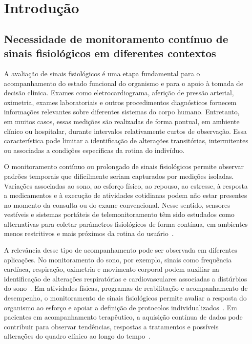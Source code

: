 \documentclass[a4paper,12pt]{fcte}
\begin{document}


\chapter{Introdução}
\label{chap:IT}

\section{Necessidade de monitoramento contínuo de sinais fisiológicos em diferentes contextos}

A avaliação de sinais fisiológicos é uma etapa fundamental para o acompanhamento do estado funcional do organismo e para o apoio à tomada de decisão clínica. Exames como eletrocardiograma, aferição de pressão arterial, oximetria, exames laboratoriais e outros procedimentos diagnósticos fornecem informações relevantes sobre diferentes sistemas do corpo humano. Entretanto, em muitos casos, essas medições são realizadas de forma pontual, em ambiente clínico ou hospitalar, durante intervalos relativamente curtos de observação. Essa característica pode limitar a identificação de alterações transitórias, intermitentes ou associadas a condições específicas da rotina do indivíduo.

O monitoramento contínuo ou prolongado de sinais fisiológicos permite observar padrões temporais que dificilmente seriam capturados por medições isoladas. Variações associadas ao sono, ao esforço físico, ao repouso, ao estresse, à resposta a medicamentos e à execução de atividades cotidianas podem não estar presentes no momento da consulta ou do exame convencional. Nesse sentido, sensores vestíveis e sistemas portáteis de telemonitoramento têm sido estudados como alternativas para coletar parâmetros fisiológicos de forma contínua, em ambientes menos restritivos e mais próximos da rotina do usuário~\cite{ates2022wearable_sensors,vaghasiya2023wearable_telehealth}.

A relevância desse tipo de acompanhamento pode ser observada em diferentes aplicações. No monitoramento do sono, por exemplo, sinais como frequência cardíaca, respiração, oximetria e movimento corporal podem auxiliar na identificação de alterações respiratórias e cardiovasculares associadas a distúrbios do sono~\cite{kwon2021sleep_monitoring_wearables,osa2025sleep_apnea_wearables}. Em atividades físicas, programas de reabilitação e acompanhamento de desempenho, o monitoramento de sinais fisiológicos permite avaliar a resposta do organismo ao esforço e apoiar a definição de protocolos individualizados~\cite{hughes2023wearable_cardiovascular,charlton2022wearable_ppg}. Em pacientes em acompanhamento terapêutico, a aquisição contínua de dados pode contribuir para observar tendências, respostas a tratamentos e possíveis alterações do quadro clínico ao longo do tempo~\cite{tan2024remote_patient_monitoring,peyroteo2021remote_monitoring_chronic}.
\end{document}
